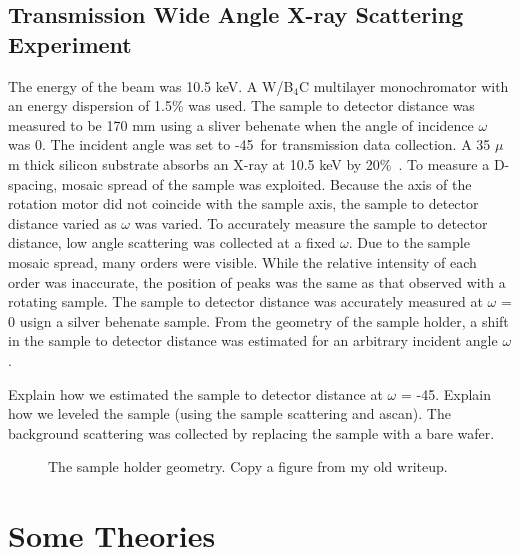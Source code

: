 \subsection{Transmission Wide Angle X-ray Scattering Experiment}
The energy of the beam was 10.5 keV. A W/B$_4$C multilayer monochromator
with an energy dispersion of 1.5\% was used. The sample to detector
distance was measured to be 170 mm using a sliver behenate 
when the angle of incidence $\omega$ was 0\textdegree.
The incident angle was set to -45\textdegree\ for transmission data
collection. A 35 $\mu$m thick silicon substrate absorbs an X-ray at
10.5 keV by 20\%\ \cite{ref:cxro}. 
To measure a D-spacing, mosaic spread of the sample was exploited. Because 
the axis of the rotation motor did not coincide with the sample axis,
the sample to detector distance varied as $\omega$ was varied. To accurately
measure the sample to detector distance, low angle scattering was collected
at a fixed $\omega$. Due to the sample mosaic spread, many orders were
visible. While the relative intensity of each order was inaccurate, 
the position of peaks was the same as that observed with a rotating sample.
The sample to detector distance was accurately measured at $\omega$ = 0\textdegree
usign a silver behenate sample. From the geometry of the sample holder,
a shift in the sample to detector distance was estimated for an arbitrary 
incident angle $\omega$.

Explain how we estimated the sample to detector distance at
$\omega$ = -45\textdegree. Explain how we leveled the sample 
(using the sample scattering and ascan).
The background scattering was collected by replacing the sample with a bare 
wafer.

\begin{figure}
  \centering
  \caption{The sample holder geometry. Copy a figure from my old writeup.}
  \label{fig:sample_holder}
\end{figure}

\section{Some Theories}\label{sec:some_theories}

